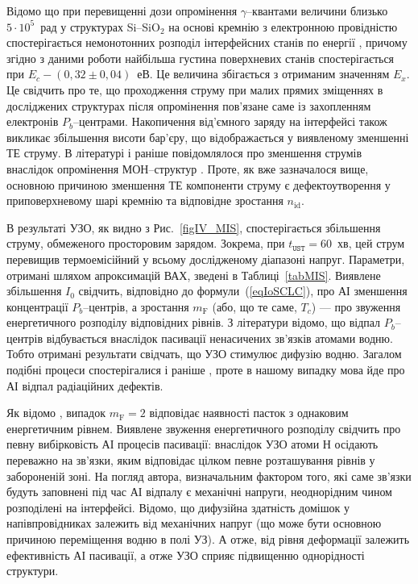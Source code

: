 Відомо що при перевищенні дози опромінення $\gamma$--квантами величини близько $5\cdot10^5$~рад у структурах Si--SiO$_2$ на основі кремнію з електронною провідністю спостерігається немонотонних розподіл інтерфейсних станів по енергії \cite{PersenkovBook},
причому згідно з даними роботи \cite{ParchSiO2} найбільша густина поверхневих станів спостерігається при
$E_c-(0,32\pm0,04)$~еВ.
Це величина збігається з отриманим значенням $E_x$.
Це свідчить про те, що проходження струму при малих прямих зміщеннях в досліджених структурах після опромінення пов'язане саме із захопленням електронів $P_b$--центрами.
Накопичення від'ємного заряду на інтерфейсі також викликає збільшення висоти бар'єру,
що відображається у виявленому зменшенні ТЕ струму.
В літературі і раніше повідомлялося про зменшення струмів внаслідок опромінення МОН--структур \cite{SiO2:Niu}.
Проте, як вже зазначалося вище, основною причиною зменшення ТЕ компоненти струму є дефектоутворення у приповерхневому шарі кремнію та відповідне зростання $n_\mathrm{id}$.

В результаті УЗО, як видно з Рис.~\ref{figIV_MIS}, спостерігається збільшення струму, обмеженого просторовим зарядом.
Зокрема, при $t_\mathtt{UST}=60$~хв, цей струм перевищив термоемісійний у всьому дослідженому діапазоні напруг.
Параметри, отримані шляхом апроксимацій ВАХ, зведені в Таблиці~\ref{tabMIS}.
Виявлене збільшення $I_0$ свідчить, відповідно до формули~(\ref{eqIoSCLC}), про АІ зменшення концентрації $P_b$--центрів, а зростання $m_\mathrm{F}$ (або, що те саме, $T_c$) --- про звуження енергетичного розподілу відповідних рівнів.
З літератури \cite{SiO2:Takakura,SiO2:Wurzer} відомо, що відпал $P_b$--центрів відбувається внаслідок пасивації ненасичених зв'язків атомами водню.
Тобто отримані результати свідчать, що УЗО стимулює дифузію водню.
Загалом подібні процеси спостерігалися і раніше \cite{Ostap:SiO2,Ostap:PhotoLum,ostapenko1997}, проте в нашому випадку мова йде про АІ відпал радіаційних дефектів.


Як відомо \cite{Jafar}, випадок $m_\mathrm{F}=2$ відповідає наявності пасток з однаковим енергетичним рівнем.
Виявлене звуження енергетичного розподілу свідчить про певну вибірковість АІ процесів пасивації:
внаслідок УЗО атоми Н осідають переважно на зв'язки, яким відповідає цілком певне розташування рівнів у забороненій зоні.
На погляд автора, визначальним фактором того, які саме зв'язки будуть заповнені під час АІ відпалу є механічні напруги, неоднорідним чином розподілені на інтерфейсі.
Відомо, що дифузійна здатність домішок у напівпровідниках залежить від механічних напруг \cite{AZIZ2001}
(що може бути основною причиною переміщення водню в полі УЗ).
А отже, від рівня деформації залежить ефективність АІ пасивації, а отже УЗО сприяє підвищенню однорідності структури.

